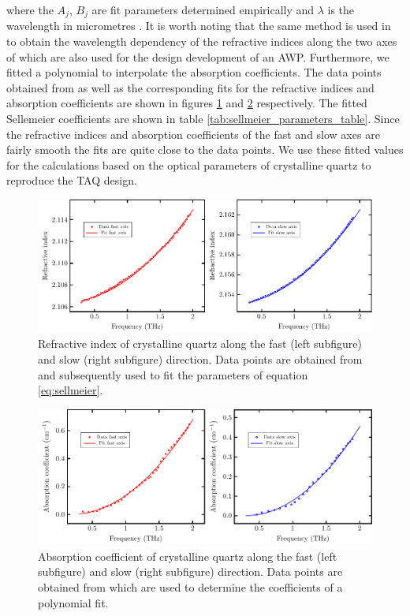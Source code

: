 where the $A_j$, $B_j$ are fit parameters determined empirically and $\lambda$ is the wavelength in micrometres \cite{Sellmeier1872}. It is worth noting that the same method is used in \cite{Vilas2013} to obtain the wavelength dependency of the refractive indices along the two axes of  which are also used for the design development of an AWP. Furthermore, we fitted a polynomial to interpolate the absorption coefficients. The data points obtained from \cite{DGrischkowsky1990} as well as the corresponding fits for the refractive indices and absorption coefficients are shown in figures \ref{fig:ri_quartz} and \ref{fig:abs_quartz} respectively. The fitted Sellemeier coefficients are shown in table \ref{tab:sellmeier_parameters_table}. Since the refractive indices and absorption coefficients of the fast and slow axes are fairly smooth the fits are quite close to the data points. We use these fitted values for the calculations based on the optical parameters of crystalline quartz to reproduce the TAQ design.

\begin{figure}[H]
    \centering
    \includegraphics[scale=0.7]{images/7_appendix/plots/quartz_fits/ri_quartz.pdf}
    \caption{Refractive index of crystalline quartz along the fast (left subfigure) and slow (right subfigure) direction. Data points are obtained from \cite{DGrischkowsky1990} and subsequently used to fit the parameters of equation \ref{eq:sellmeier}.}
    \label{fig:ri_quartz}
\end{figure}

\begin{figure}[H]
    \centering
    \includegraphics[scale=0.7]{images/7_appendix/plots/quartz_fits/abs_quartz.pdf}
    \caption{Absorption coefficient of crystalline quartz along the fast (left subfigure) and slow (right subfigure) direction. Data points are obtained from \cite{DGrischkowsky1990} which are used to determine the coefficients of a polynomial fit.}
    \label{fig:abs_quartz}
\end{figure}

